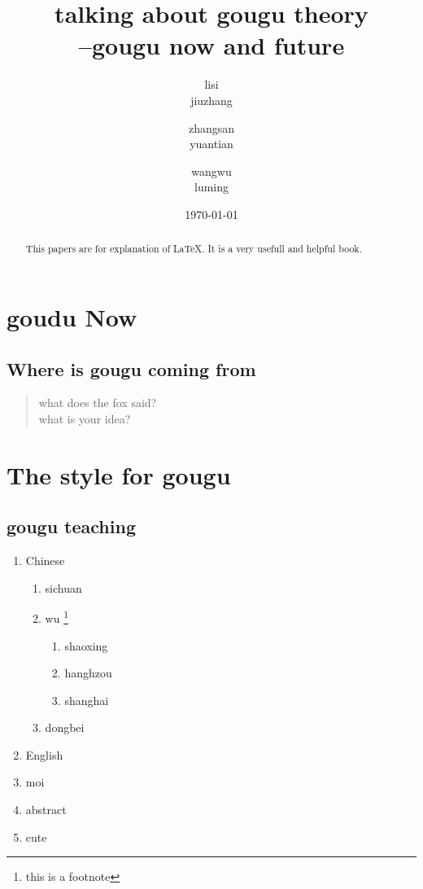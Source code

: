 \documentclass[a4paper]{article}
\title{talking about gougu theory\\--gougu now and future}
\author{lisi\\jiuzhang \and zhangsan\\yuantian \and wangwu\\luming}
\date{\today}
\begin{document}
\maketitle

\tableofcontents

\begin{abstract}
    This papers are for explanation of \LaTeX{}. It is a very usefull and helpful book.
\end{abstract}

\section{goudu Now}
\subsection{Where is gougu coming from}

\begin{quotation}
    what does the fox said? \cite{bigler_daily_2019} \\

    what is  your idea? \cite{jourdan_how_2020,wu_describing_2017,jourdan_effect_2019}
\end{quotation}



\section{The style for gougu}
\subsection{gougu teaching}

\begin{enumerate}
    \item Chinese
          \begin{enumerate}
              \item sichuan
              \item wu \footnote{this is a footnote}
                    \begin{enumerate}
                        \item shaoxing
                        \item hanghzou
                        \item shanghai
                    \end{enumerate}
              \item dongbei

          \end{enumerate}
    \item English
    \item moi
    \item abstract
    \item cute
\end{enumerate}
\end{document}
